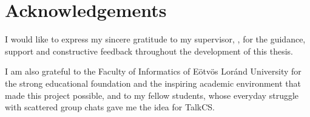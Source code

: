 \chapter*{Acknowledgements}

I would like to express my sincere gratitude to my supervisor, \supervisorname, for the
guidance, support and constructive feedback throughout the development of this thesis.

I am also grateful to the Faculty of Informatics of Eötvös Loránd University for the
strong educational foundation and the inspiring academic environment that made this
project possible, and to my fellow students, whose everyday struggle with scattered
group chats gave me the idea for TalkCS.
